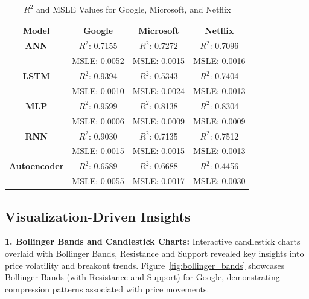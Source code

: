 \documentclass[conference]{IEEEtran}
\begin{document}
\begin{table}[h!]
\centering
\caption{$R^2$ and MSLE Values for Google, Microsoft, and Netflix}
\label{tab:results_detailed_part2}
\begin{tabular}{|c|c|c|c|}
\hline
\textbf{Model}      & \textbf{Google}           & \textbf{Microsoft}         & \textbf{Netflix}           \\ \hline
\textbf{ANN}        & $R^2$: 0.7155             & $R^2$: 0.7272             & $R^2$: 0.7096             \\ 
                    & MSLE: 0.0052              & MSLE: 0.0015              & MSLE: 0.0016              \\ \hline
\textbf{LSTM}       & $R^2$: 0.9394             & $R^2$: 0.5343             & $R^2$: 0.7404             \\ 
                    & MSLE: 0.0010              & MSLE: 0.0024              & MSLE: 0.0013              \\ \hline
\textbf{MLP}        & $R^2$: 0.9599             & $R^2$: 0.8138             & $R^2$: 0.8304             \\ 
                    & MSLE: 0.0006              & MSLE: 0.0009              & MSLE: 0.0009              \\ \hline
\textbf{RNN}        & $R^2$: 0.9030             & $R^2$: 0.7135             & $R^2$: 0.7512             \\ 
                    & MSLE: 0.0015              & MSLE: 0.0015              & MSLE: 0.0013              \\ \hline
\textbf{Autoencoder} & $R^2$: 0.6589            & $R^2$: 0.6688             & $R^2$: 0.4456             \\ 
                    & MSLE: 0.0055              & MSLE: 0.0017              & MSLE: 0.0030              \\ \hline
\end{tabular}
\end{table}

\subsection{Visualization-Driven Insights}

\textbf{1. Bollinger Bands and Candlestick Charts:} 
Interactive candlestick charts overlaid with Bollinger Bands, Resistance and Support revealed key insights into price volatility and breakout trends. Figure~\ref{fig:bollinger_bands} showcases Bollinger Bands (with Resistance and Support) for Google, demonstrating compression patterns associated with price movements.
\end{document}
